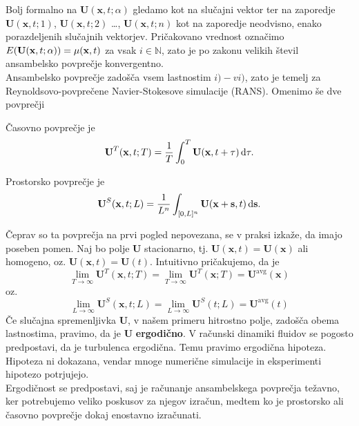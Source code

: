 \documentclass[mat2, tisk]{fmfdelo}
\newcommand{\N}{\mathbb N}
\newcommand{\bd}{\textbf}
\begin{document}
Bolj formalno na $\bd{U}(\bd{x}, t;\alpha)$ gledamo kot na slučajni vektor ter na zaporedje 
$\bd{U}(\bd{x}, t; 1)$, $\bd{U}(\bd{x}, t; 2)$ \dots, $\bd{U}(\bd{x}, t;n)$ kot na zaporedje neodvisno, enako porazdeljenih 
slučajnih vektorjev. Pričakovano vrednost označimo $E(\bd{U}(\bd{x}, t; \alpha)) = \bd{\text{$\mu$}}(\bd{x}, t)$ za vsak $i\in\N$, zato je po 
zakonu velikih števil ansambelsko povprečje konvergentno.\\

Ansambelsko povprečje zadošča vsem lastnostim $i) - vi)$, zato je temelj za \\
Reynoldsovo-povprečene Navier-Stokesove simulacije (RANS). Omenimo še dve povprečji
\begin{definicija}
Časovno povprečje je 
\begin{equation*}
\bd{U}^T(\bd{x}, t; T) = \frac{1}{T}\int_0^T \bd{U}(\bd{x}, t + \tau) \dif \tau.
\end{equation*}
\end{definicija}

\begin{definicija}
Prostorsko povprečje je 
\begin{equation*}
\bd{U}^S(\bd{x}, t; L) = \frac{1}{L^n}\int_{[0, L]^n} \bd{U}(\bd{x} + \bd{s}, t) \dif \bd{s}.
\end{equation*}
\end{definicija}

Čeprav so ta povprečja na prvi pogled nepovezana, se v praksi izkaže, da imajo poseben 
pomen. Naj bo polje $\bd{U}$ stacionarno, tj. $\bd{U}(\bd{x}, t) = \bd{U}(\bd{x})$ ali homogeno, oz. $\bd{U}(\bd{x}, t) = \bd{U}(t)$.
Intuitivno pričakujemo, da je 
$$
\lim_{T\rightarrow \infty} \bd{U}^T(\bd{x}, t; T) = \lim_{T\rightarrow \infty} \bd{U}^T(\bd{x}; T) = \bd{U}^\text{avg}(\bd{x})
$$
oz. 
$$
\lim_{L\rightarrow \infty} \bd{U}^S(\bd{x}, t; L) = \lim_{L\rightarrow \infty} \bd{U}^S(t; L) = \bd{U}^\text{avg}(t)
$$
Če slučajna spremenljivka $\bd{U}$, v našem primeru hitrostno polje, zadošča obema lastnostima, 
pravimo, da je $\bd{U}$ \textbf{ergodično}. V računski dinamiki fluidov se pogosto predpostavi, da je turbulenca ergodična. 
Temu pravimo ergodična hipoteza. Hipoteza ni dokazana, vendar mnoge numerične simulacije in eksperimenti hipotezo potrjujejo. \\
Ergodičnost se predpostavi, saj je računanje ansambelskega povprečja težavno, ker potrebujemo 
veliko poskusov za njegov izračun, medtem ko je prostorsko ali časovno povprečje dokaj 
enostavno izračunati.
\end{document}

